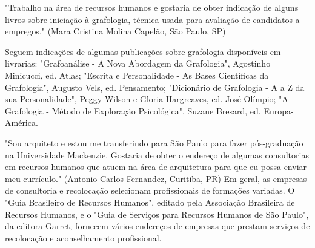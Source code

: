 "Trabalho na área de recursos humanos e gostaria de obter indicação de alguns livros sobre iniciação à grafologia, técnica usada para avaliação de candidatos a empregos." 
(Mara Cristina Molina Capelão, São Paulo, SP)

Seguem indicações de algumas publicações sobre grafologia disponíveis em livrarias:
"Grafoanálise - A Nova Abordagem da Grafologia", Agostinho Minicucci, ed. Atlas;
"Escrita e Personalidade - As Bases Científicas da Grafologia", Augusto Vels, ed. Pensamento;
"Dicionário de Grafologia - A a Z da sua Personalidade", Peggy Wilson e Gloria Hargreaves, ed. José Olímpio;
"A Grafologia - Método de Exploração Psicológica", Suzane Bresard, ed. Europa-América.
 
"Sou arquiteto e estou me transferindo para São Paulo para fazer pós-graduação na Universidade Mackenzie. Gostaria de obter o endereço de algumas consultorias em recursos humanos que atuem na área de arquitetura para que eu possa enviar meu currículo." 
(Antonio Carlos Fernandez, Curitiba, PR)
Em geral, as empresas de consultoria e recolocação selecionam profissionais de formações variadas. O "Guia Brasileiro de Recursos Humanos", editado pela Associação Brasileira de Recursos Humanos, e o "Guia de Serviços para Recursos Humanos de São Paulo", da editora Garret, fornecem vários endereços de empresas que prestam serviços de recolocação e aconselhamento profissional.

